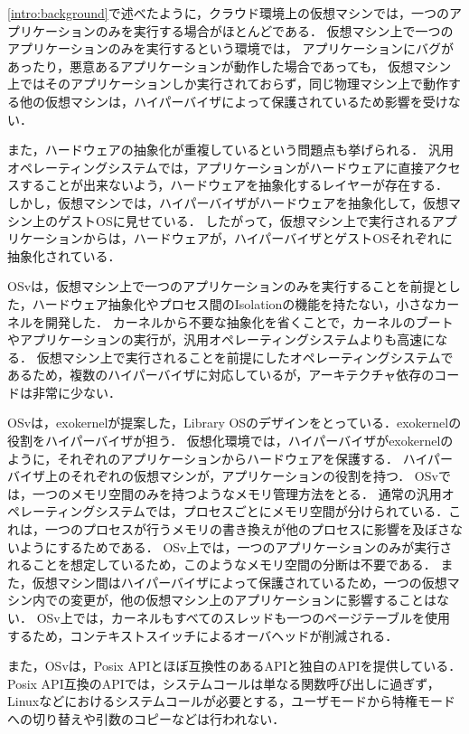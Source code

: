 \documentclass[graduation-thesis]{mlarticle}
\begin{document}
\ref{intro:background}で述べたように，クラウド環境上の仮想マシンでは，一つのアプリケーションのみを実行する場合がほとんどである．
仮想マシン上で一つのアプリケーションのみを実行するという環境では，
アプリケーションにバグがあったり，悪意あるアプリケーションが動作した場合であっても，
仮想マシン上ではそのアプリケーションしか実行されておらず，同じ物理マシン上で動作する他の仮想マシンは，ハイパーバイザによって保護されているため影響を受けない．

また，ハードウェアの抽象化が重複しているという問題点も挙げられる．
汎用オペレーティングシステムでは，アプリケーションがハードウェアに直接アクセスすることが出来ないよう，ハードウェアを抽象化するレイヤーが存在する．
しかし，仮想マシンでは，ハイパーバイザがハードウェアを抽象化して，仮想マシン上のゲストOSに見せている．
したがって，仮想マシン上で実行されるアプリケーションからは，ハードウェアが，ハイパーバイザとゲストOSそれぞれに抽象化されている．

OSvは，仮想マシン上で一つのアプリケーションのみを実行することを前提とした，ハードウェア抽象化やプロセス間のIsolationの機能を持たない，小さなカーネルを開発した．
カーネルから不要な抽象化を省くことで，カーネルのブートやアプリケーションの実行が，汎用オペレーティングシステムよりも高速になる．
仮想マシン上で実行されることを前提にしたオペレーティングシステムであるため，複数のハイパーバイザに対応しているが，アーキテクチャ依存のコードは非常に少ない．

OSvは，exokernelが提案した，Library OSのデザインをとっている．exokernelの役割をハイパーバイザが担う．
仮想化環境では，ハイパーバイザがexokernelのように，それぞれのアプリケーションからハードウェアを保護する．
ハイパーバイザ上のそれぞれの仮想マシンが，アプリケーションの役割を持つ．
OSvでは，一つのメモリ空間のみを持つようなメモリ管理方法をとる．
通常の汎用オペレーティングシステムでは，プロセスごとにメモリ空間が分けられている．これは，一つのプロセスが行うメモリの書き換えが他のプロセスに影響を及ぼさないようにするためである．
OSv上では，一つのアプリケーションのみが実行されることを想定しているため，このようなメモリ空間の分断は不要である．
また，仮想マシン間はハイパーバイザによって保護されているため，一つの仮想マシン内での変更が，他の仮想マシン上のアプリケーションに影響することはない．
OSv上では，カーネルもすべてのスレッドも一つのページテーブルを使用するため，コンテキストスイッチによるオーバヘッドが削減される．

また，OSvは，Posix APIとほぼ互換性のあるAPIと独自のAPIを提供している．Posix API互換のAPIでは，システムコールは単なる関数呼び出しに過ぎず，Linuxなどにおけるシステムコールが必要とする，ユーザモードから特権モードへの切り替えや引数のコピーなどは行われない．
\end{document}
